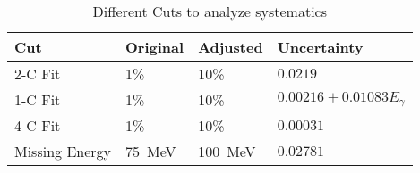 \begin{table}[h!]
\begin{center}


\caption[Variance of Data Cut Systematics]{\label{tab:cutsystematics}Different Cuts to analyze systematics \vspace{0.75mm}}

\begin{tabular}{p{2.25cm} | p{1.25cm}|p{1.25cm} | p{2.8cm}}
\hline
Cut & Original & Adjusted & Uncertainty \\
\hline
2-C Fit  & 1\% & 10\% & $0.0219$\\
1-C Fit  & 1\% & 10\% & $ 0.00216 + 0.01083E_{\gamma}$ \\
4-C Fit  & 1\% & 10\% & $0.00031$\\
Missing Energy  & 75~MeV & 100~MeV & $0.02781$\\
\hline \hline
\end{tabular}


\end{center}
\end{table}
\vspace{20pt}